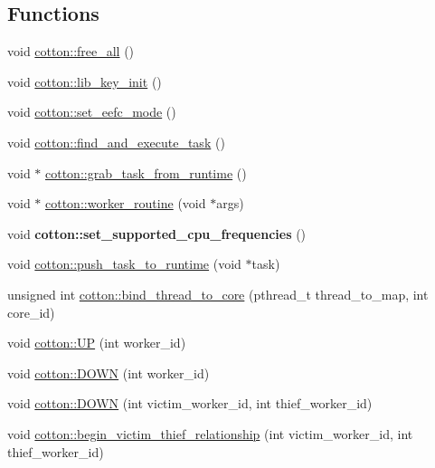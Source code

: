 \subsection*{Functions}
\begin{DoxyCompactItemize}
\item 
void \mbox{\hyperlink{cotton-runtime_8h_ad169fe95f5f03bdfa569dd365dde6c12}{cotton\+::free\+\_\+all}} ()
\item 
void \mbox{\hyperlink{cotton-runtime_8h_a4ea9036584fa3bd86fe8626dc05d295f}{cotton\+::lib\+\_\+key\+\_\+init}} ()
\item 
void \mbox{\hyperlink{cotton-runtime_8h_aac28063e6fe138ec81c444e83b7f6ffc}{cotton\+::set\+\_\+eefc\+\_\+mode}} ()
\item 
void \mbox{\hyperlink{cotton-runtime_8h_af22caee9434a7e06a09b2f9a0417c1eb}{cotton\+::find\+\_\+and\+\_\+execute\+\_\+task}} ()
\item 
void $\ast$ \mbox{\hyperlink{cotton-runtime_8h_a1cae25b77bd884fcdcf2532663056d22}{cotton\+::grab\+\_\+task\+\_\+from\+\_\+runtime}} ()
\item 
void $\ast$ \mbox{\hyperlink{cotton-runtime_8h_a361c34063ecb68cf02d417074decb12b}{cotton\+::worker\+\_\+routine}} (void $\ast$args)
\item 
\mbox{\label{cotton-runtime_8h_a399a666655a31ad2b3c8eae4b1d6d707}} 
void {\bfseries cotton\+::set\+\_\+supported\+\_\+cpu\+\_\+frequencies} ()
\item 
void \mbox{\hyperlink{cotton-runtime_8h_a803285410d295a5f32238ad2dfc241a5}{cotton\+::push\+\_\+task\+\_\+to\+\_\+runtime}} (void $\ast$task)
\item 
unsigned int \mbox{\hyperlink{cotton-runtime_8h_a325b0808848e793c747e547f6e660efd}{cotton\+::bind\+\_\+thread\+\_\+to\+\_\+core}} (pthread\+\_\+t thread\+\_\+to\+\_\+map, int core\+\_\+id)
\item 
void \mbox{\hyperlink{cotton-runtime_8h_ae91d8cfb1b831a971eafccb512c17a15}{cotton\+::\+UP}} (int worker\+\_\+id)
\item 
void \mbox{\hyperlink{cotton-runtime_8h_a522a9376ec51306eab1724b2a9a1cf93}{cotton\+::\+D\+O\+WN}} (int worker\+\_\+id)
\item 
void \mbox{\hyperlink{cotton-runtime_8h_a5b31e108dfdf198f421dab591cb009fc}{cotton\+::\+D\+O\+WN}} (int victim\+\_\+worker\+\_\+id, int thief\+\_\+worker\+\_\+id)
\item 
void \mbox{\hyperlink{cotton-runtime_8h_af567cb17aa6a653d9a567fb65f40b716}{cotton\+::begin\+\_\+victim\+\_\+thief\+\_\+relationship}} (int victim\+\_\+worker\+\_\+id, int thief\+\_\+worker\+\_\+id)

\end{DoxyCompactItemize}
